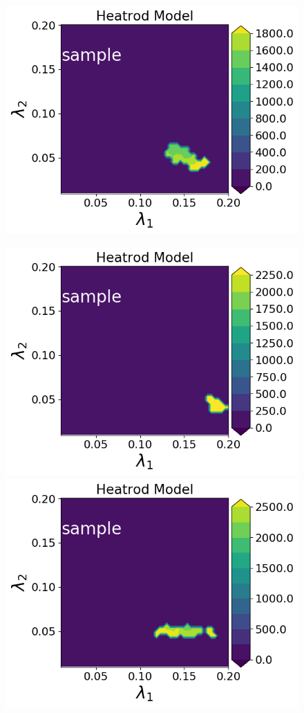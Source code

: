 \begin{figure}[h]
\begin{minipage}{.4\textwidth}
\includegraphics[width=\linewidth]{examples/fig_heatrod_q1/HeatrodModel--sample_N500_mc.png}

\includegraphics[width=\linewidth]{examples/fig_heatrod_q2/HeatrodModel--sample_N50_mc.png}
\includegraphics[width=\linewidth]{examples/fig_heatrod_q2/HeatrodModel--sample_N500_mc.png}
\end{minipage}


\end{figure}
